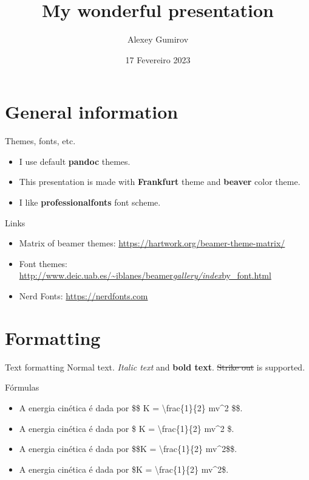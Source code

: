 \documentclass[
  11pt,
  ignorenonframetext,
  aspectratio=169,
  aspectratio=169]{beamer}
\title{My wonderful presentation}
\author{Alexey Gumirov}
\date{17 Fevereiro 2023}
\institute{My home office}
\providecommand{\tightlist}{%
  \setlength{\itemsep}{0pt}\setlength{\parskip}{0pt}}
\begin{document}
\frame{\titlepage}

\begin{frame}
  \tableofcontents[hideallsubsections]
\end{frame}
\hypertarget{general-information}{%
\section{General information}\label{general-information}}

\begin{frame}{Themes, fonts, etc.}
\protect\hypertarget{themes-fonts-etc.}{}
\begin{itemize}
\tightlist
\item
  I use default \textbf{pandoc} themes.
\item
  This presentation is made with \textbf{Frankfurt} theme and
  \textbf{beaver} color theme.
\item
  I like \textbf{professionalfonts} font scheme.
\end{itemize}
\end{frame}

\begin{frame}{Links}
\protect\hypertarget{links}{}
\begin{itemize}
\tightlist
\item
  Matrix of beamer themes:
  \url{https://hartwork.org/beamer-theme-matrix/}
\item
  Font themes:
  \href{http://www.deic.uab.es/~iblanes/beamer_gallery/index_by_font.html}{http://www.deic.uab.es/\textasciitilde iblanes/beamer\emph{gallery/index}by\_font.html}
\item
  Nerd Fonts: \url{https://nerdfonts.com}
\end{itemize}
\end{frame}

\hypertarget{formatting}{%
\section{Formatting}\label{formatting}}

\begin{frame}{Text formatting}
\protect\hypertarget{text-formatting}{}
Normal text. \emph{Italic text} and \textbf{bold text}. \st{Strike out}
is supported.
\end{frame}

\begin{frame}{Fórmulas}
\protect\hypertarget{fuxf3rmulas}{}
\begin{itemize}
\tightlist
\item
  A energia cinética é dada por \$\$ K = \textbackslash frac\{1\}\{2\}
  mv\^{}2 \$\$.
\item
  A energia cinética é dada por \$ K = \textbackslash frac\{1\}\{2\}
  mv\^{}2 \$.
\item
  A energia cinética é dada por \$\$K = \textbackslash frac\{1\}\{2\}
  mv\^{}2\$\$.
\item
  A energia cinética é dada por \$K = \textbackslash frac\{1\}\{2\}
  mv\^{}2\$.
\end{itemize}
\end{frame}
\end{document}
